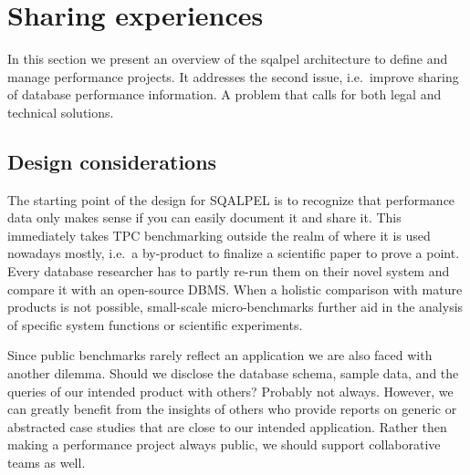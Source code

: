 \documentclass{cidr-2019}
\begin{document}


\section{Sharing experiences}\label{sharing}
In this section we present an overview of the {\sc sqalpel}
architecture to define and manage performance projects. It addresses
the second issue, i.e.\ improve sharing of database performance
information. A problem that calls for both legal and technical
solutions.

\subsection{Design considerations}
The starting point of the design for {\sc
SQALPEL} is to recognize that performance data only makes sense if
you can easily document it and share it. 
This immediately takes TPC benchmarking outside the realm of where it is used nowadays mostly, i.e.\ a
  by-product to finalize a scientific paper to prove a point. Every
  database researcher has to partly re-run them on their novel system
  and compare it with an open-source DBMS.
When a holistic comparison with mature products is not possible, small-scale
micro-benchmarks further aid in the analysis of specific system
functions or scientific experiments.

Since public benchmarks rarely reflect an application we
are also faced with another dilemma. Should we disclose the database
schema, sample data, and the queries of our intended product with
others? Probably not always.
However, we can greatly benefit from the insights of others who provide reports on generic or
abstracted case studies that are close to our intended
application. 
Rather then making a performance project always public,  we should support 
collaborative teams as well.
\end{document}
